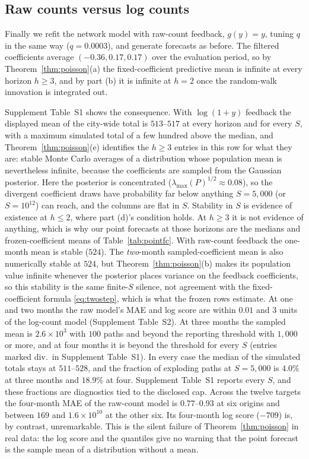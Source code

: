 \documentclass[12pt]{article}
\theoremstyle{plain}
\theoremstyle{definition}
\theoremstyle{remark}
\newcommand{\QRaw}{0.0003}
\newcommand{\BetaRawMean}{-0.36, 0.17, 0.17}
\begin{document}
\subsection{Raw counts versus log counts}\label{sec:rawlog}
Finally we refit the network model with raw-count feedback, $g(y)=y$, tuning $q$ in the same way ($q=\QRaw$), and generate forecasts as before. The filtered coefficients average $(\BetaRawMean)$ over the evaluation period, so by Theorem~\ref{thm:poisson}(a) the fixed-coefficient predictive mean is infinite at every horizon $h\ge3$, and by part (b) it is infinite at $h=2$ once the random-walk innovation is integrated out.


Supplement Table~S1 shows the consequence. With $\log(1+y)$ feedback the displayed mean of the city-wide total is $513$--$517$ at every horizon and for every $S$, with a maximum simulated total of a few hundred above the median, and Theorem~\ref{thm:poisson}(e) identifies the $h\ge3$ entries in this row for what they are: stable Monte Carlo averages of a distribution whose population mean is nevertheless infinite, because the coefficients are sampled from the Gaussian posterior. Here the posterior is concentrated ($\lambda_{\max}(P)^{1/2}\approx0.08$), so the divergent coefficient draws have probability far below anything $S=5{,}000$ (or $S=10^{12}$) can reach, and the columns are flat in $S$. Stability in $S$ is evidence of existence at $h\le2$, where part (d)'s condition holds. At $h\ge3$ it is not evidence of anything, which is why our point forecasts at those horizons are the medians and frozen-coefficient means of Table~\ref{tab:pointfc}. With raw-count feedback the one-month mean is stable ($524$). The \emph{two}-month sampled-coefficient mean is also numerically stable at $524$, but Theorem~\ref{thm:poisson}(b) makes its population value infinite whenever the posterior places variance on the feedback coefficients, so this stability is the same finite-$S$ silence, not agreement with the fixed-coefficient formula \eqref{eq:twostep}, which is what the frozen rows estimate. At one and two months the raw model's MAE and log score are within $0.01$ and $3$ units of the log-count model (Supplement Table~S2). At three months the sampled mean is $2.6\times10^{3}$ with $100$ paths and beyond the reporting threshold with $1{,}000$ or more, and at four months it is beyond the threshold for every $S$ (entries marked div.\ in Supplement Table~S1). In every case the median of the simulated totals stays at $511$--$528$, and the fraction of exploding paths at $S=5{,}000$ is $4.0\%$ at three months and $18.9\%$ at four. Supplement Table~S1 reports every $S$, and these fractions are diagnostics tied to the disclosed cap. Across the twelve targets the four-month MAE of the raw-count model is $0.77$--$0.93$ at six origins and between $169$ and $1.6\times10^{10}$ at the other six. Its four-month log score ($-709$) is, by contrast, unremarkable. This is the silent failure of Theorem~\ref{thm:poisson} in real data: the log score and the quantiles give no warning that the point forecast is the sample mean of a distribution without a mean.
\end{document}
